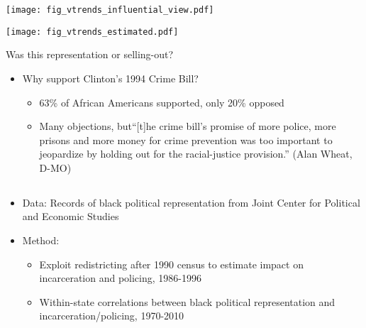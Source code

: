 \documentclass{beamer}
\begin{document}
\begin{frame}{\claimfourq}
\begin{center}
    \texttt{[image: fig\_vtrends\_influential\_view.pdf]}
\end{center}
\end{frame}

\begin{frame}{\claimfourq}
\begin{center}
    \texttt{[image: fig\_vtrends\_estimated.pdf]}
\end{center}
\end{frame}

\begin{frame}{Was this representation or selling-out?}
\begin{itemize}[<+->]
    \item[] \alert{Why support Clinton's 1994 Crime Bill?}
    \begin{itemize}
        \item 63\% of African Americans supported, only 20\% opposed
        \item Many objections, but``[t]he crime bill's promise of more police, more prisons and more money for crime prevention was too important to jeopardize by holding out for the racial-justice provision.'' (Alan Wheat, D-MO)
    \end{itemize}
\end{itemize}
\end{frame}

\begin{frame}{}
\begin{center}
    {\Large \claimfiveq}
\end{center}
\end{frame}

\subsection{\claimfiveq}
\begin{frame}{\claimfiveq}
\begin{itemize}[<+->]
    \item[] \alert{Data:} Records of black political representation from Joint Center for Political and Economic Studies
    \item[] \alert{Method:}
    \begin{itemize}
        \item Exploit redistricting after 1990 census to estimate impact on incarceration and policing, 1986-1996
        \item Within-state correlations between black political representation and incarceration/policing, 1970-2010
    \end{itemize}
\end{itemize}
\end{frame}
\end{document}
